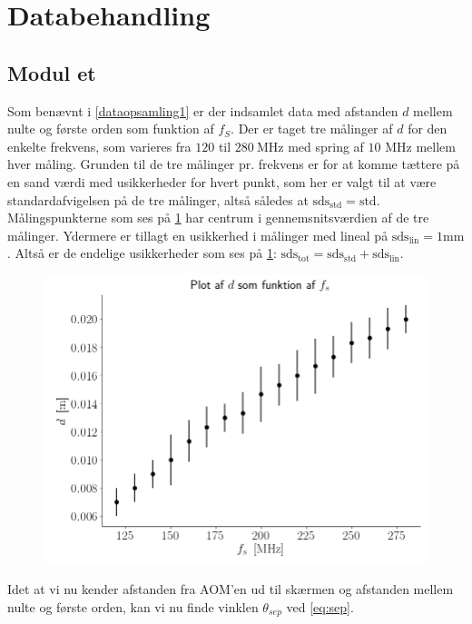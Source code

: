 \documentclass[main]{subfiles}
\begin{document}
\section{Databehandling}
\subsection{Modul et}

Som benævnt i \cref{dataopsamling1} er der indsamlet data med afstanden $d$ mellem nulte og første orden som funktion af $f_S$. Der er taget tre målinger af $d$ for den enkelte frekvens, som varieres fra $120$ til $280 \ \si{\mega\hertz}$ med spring af $10$ $\si{\mega\hertz}$ mellem hver måling. Grunden til de tre målinger pr. frekvens er for at komme tættere på en sand værdi med usikkerheder for hvert punkt, som her er valgt til at være standardafvigelsen på de tre målinger, altså således at $\text{sds}_{\text{std}} = \text{std}$. Målingspunkterne som ses på \cref{fig:rawdata_modul1} har centrum i gennemsnitsværdien af de tre målinger. Ydermere er tillagt en usikkerhed i målinger med lineal på $ \text{sds}_{\text{lin}} = 1 \si{\milli\meter} $ . Altså er de endelige usikkerheder som ses på \cref{fig:rawdata_modul1}:  $ \text{sds}_{\text{tot}} = \text{sds}_{\text{std}} + \text{sds}_{\text{lin}} $.
\begin{figure}[H]
    \centering
    \includegraphics[width=\linewidth]{tegninger/rawdata_modul1.png}
    \caption{}
    \label{fig:rawdata_modul1}
\end{figure}
Idet at vi nu kender afstanden fra AOM'en ud til skærmen og afstanden mellem nulte og første orden, kan vi nu finde vinklen $\theta_{sep}$ ved \cref{eq:sep}.
\end{document}
